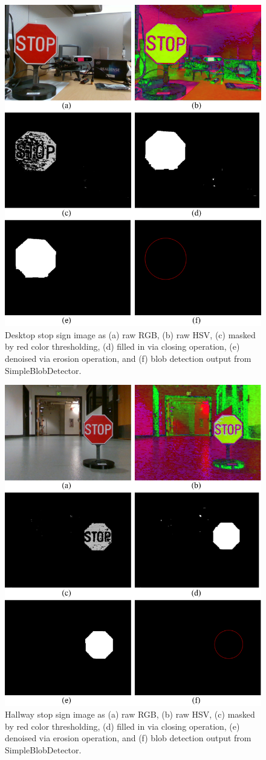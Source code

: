 \documentclass[letterpaper, 10 pt, conference]{ieeeconf}  %
\begin{document}
\begin{figure}[tp]
\begin{center}
\includegraphics[width=.48\textwidth]{Figures/stopsign/stopsign_desk.png}
\caption{Desktop stop sign image as (a) raw RGB, (b) raw HSV, (c) masked by red color thresholding, (d) filled in via closing operation, (e) denoised via erosion operation, and (f) blob detection output from SimpleBlobDetector.}
\label{stopsigndesk}
\end{center}
\end{figure}

\begin{figure}[tp]
\begin{center}
\includegraphics[width=.48\textwidth]{Figures/stopsign/stopsign_hall.png}
\caption{Hallway stop sign image as (a) raw RGB, (b) raw HSV, (c) masked by red color thresholding, (d) filled in via closing operation, (e) denoised via erosion operation, and (f) blob detection output from SimpleBlobDetector.}
\label{stopsignhall}
\end{center}
\end{figure}
\end{document}
